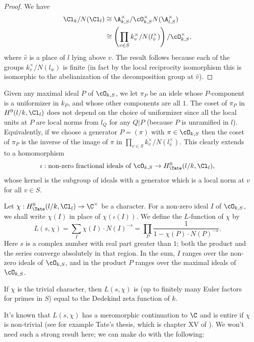\begin{proof}
	We have
	\begin{align*}
		\Cl_{k} / N(\Cl_l)
		& \cong \A_{k,S}^\times / \cO_{k,S}^\times N(\A_{l,S}^\times) \\
		& \cong \left(\prod_{v \in S} k_v^\times / N(l_{\hat v}^\times)\right) / \cO_{k,S}^\times,
	\end{align*}
	where $\hat v$ is a place of $l$ lying above $v$.
	The result follows because each of the groups $k_v^\times / N(l_w)$ is finite
	(in fact by the local reciprocity isomorphism this is isomorphic to the abelianization of the
	decomposition group at $\hat v$).
\end{proof}

Given any maximal ideal $P$ of $\cO_{k,S}$, we let $\pi_P$ be an idele whose
$P$-component is a uniformizer in $k_P$, and whose other components are all $1$.
The coset of $\pi_P$ in $H^0(l/k,\Cl_l)$ does not depend on the choice of uniformizer since
all the local units at $P$ are local norms from $l_{Q}$ for any $Q|P$
(because $P$ is unramified in $l$).
Equivalently, if we choose a generator $P=(\pi)$ with $\pi \in \cO_{k,S}$
then the coset of $\pi_P$ is the inverse of
the image of $\pi$ in $\prod_{v \in S} k_v^\times / N(l_{\hat v}^\times)$.
This clearly extends to a homomorphism
\[
	\iota : \textrm{non-zero fractional ideals of $\cO_{k,S}$}
	\to
	H^0_{\Tate}(l/k,\Cl_l),
\]
whose kernel is the subgroup of ideals with a generator which is a local norm at $v$ for
all $v \in S$.

\begin{definition} \label{def:L-function}
	Let $\chi : H^0_{\Tate}(l/k,\Cl_l) \to \C^\times$ be a character.
	For a non-zero ideal $I$ of $\cO_{k,S}$, we shall write $\chi(I)$ in place of $\chi(\iota(I))$.
	We define the $L$-function of $\chi$ by
	\[
		L(s,\chi)
		=
		\sum_{I} \chi(I) \cdot N(I)^{-s}
		=
		\prod_{P} \frac{1}{1-\chi(P) \cdot N(P)^{-s}}.
	\]
	Here $s$ is a complex number with real part greater than $1$; both the product and the series
	converge absolutely in that region.
	In the sum, $I$ ranges over the non-zero ideals of $\cO_{k,S}$, and in the product $P$
	ranges over the maximal ideals of $\cO_{k,S}$.

	If $\chi$ is the trivial character, then $L(s,\chi)$ is
	(up to finitely many Euler factors for primes in $S$)
	equal to the Dedekind zeta function of $k$.
\end{definition}


It's known that $L(s,\chi)$ has a meromorphic continuation to $\C$
and is entire if $\chi$ is non-trivial
(see for example Tate's thesis, which is chapter XV of \cite{cassells frohlich}).
We won't need such a strong result here; we can make do with the following:

